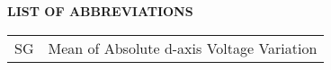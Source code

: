 \begin{center}
\fontsize{14pt}{14pt}\selectfont\bfseries {LIST OF ABBREVIATIONS}
\end{center}
\bigskip 

\begin{normalsize}
 \begin{table}[hbtp]
\renewcommand{\arraystretch}{1.5}
\begin{tabular}{p{} p{}}
SG & Mean of Absolute d-axis Voltage Variation \\

\end{tabular}
\end{table}
\end{normalsize}
